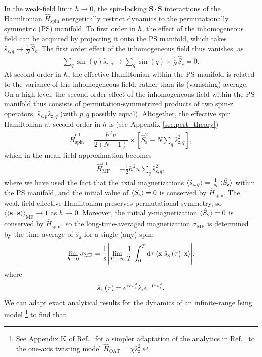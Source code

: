 \documentclass[aps,pra,nofootinbib,twocolumn,superscriptaddress]{revtex4-2}
\renewcommand{\t}{\text} %
\newcommand{\f}[2]{\dfrac{#1}{#2}} %
\newcommand{\p}[1]{\left(#1\right)} %
\renewcommand{\sp}[1]{\left[#1\right]} %
\newcommand{\bk}{\braket} %
\renewcommand{\dd}{\text{d}} %
\renewcommand{\i}{\mathrm{i}\mkern1mu} %
\newcommand{\bbk}[1]{\langle\!\langle #1 \rangle\!\rangle}
\newcommand{\1}{\mathds{1}}
\newcommand{\s}{\hat{s}}
\renewcommand{\H}{\hat{H}}
\renewcommand{\S}{\hat{S}}
\newcommand{\x}{\text{x}}
\newcommand{\y}{\text{y}}
\newcommand{\z}{\text{z}}
\newcommand{\spin}{\text{spin}}
\newcommand{\eff}{\text{eff}}
\newcommand{\MF}{\text{MF}}
\newcommand{\sds}{\bar{\bm{s}}\cdot\bar{\bm{s}}}
\begin{document}
In the weak-field limit $h\to0$, the spin-locking $\bm\S\cdot\bm\S$ interactions of the Hamiltonian $\H_\spin$ energetically restrict dynamics to the permutationally symmetric (PS) manifold.
To first order in $h$, the effect of the inhomogeneous field can be acquired by projecting it onto the PS manifold, which takes $\s_{\z,q}\to\frac1N\S_\z$.
The first order effect of the inhomogeneous field thus vanishes, as
\begin{align}
  \sum_q \sin\p{q} \s_{\z,q}
  \to \sum_q \sin\p{q} \times \frac1N \S_\z
  = 0.
\end{align}
At second order in $h$, the effective Hamiltonian within the PS manifold is related to the variance of the inhomogeneous field, rather than its (vanishing) average.
On a high level, the second-order effect of the inhomogeneous field within the PS manifold thus consists of permutation-symmetrized products of two spin-z operators, $\s_{\z,p}\s_{\z,q}$ (with $p,q$ possibly equal).
Altogether, the effective spin Hamiltonian at second order in $h$ is (see Appendix \ref{sec:pert_theory})
\begin{align}
  \H_\spin^\eff
  = \f{h^2 u}{2(N-1)} \times \sp{\S_\z^2 - N\sum_q \s_{\z,q}^2},
  \label{eq:H_spin_eff}
\end{align}
which in the mean-field approximation becomes
\begin{align}
  \H_\MF^\eff = -\frac12 h^2 u \sum_q \s_{\z,q}^2,
\end{align}
where we have used the fact that the axial magnetizations $\bk{\s_{\z,q}}=\frac1N\bk{\S_\z}$ within the PS manifold, and the initial value of $\bk{\S_\z}=0$ is conserved by $\H_\spin$.
The weak-field effective Hamiltonian preserves permutational symmetry, so $\bbk{\sds}_\MF\to1$ as $h\to0$.
Moreover, the initial y-magnetization $\bk{\S_\y}=0$ is conserved by $\H_\spin$, so the long-time-averaged magnetization $\sigma_\MF$ is determined by the time-average of $\s_\x$ for a single (any) spin:
\begin{align}
  \lim_{h\to0} \sigma_\MF
  = \f1s \abs{\lim_{T\to\infty} \f1T \int_0^T \dd\tau
  \bk{\x|\s_\x\p{\tau}|\x}},
\end{align}
where
\begin{align}
  \s_\x\p{\tau} = e^{\i\tau \s_\z^2} \s_\x e^{-\i\tau \s_\z^2}.
\end{align}
We can adapt exact analytical results for the dynamics of an infinite-range Ising model \cite{foss-feig2013nonequilibrium}\footnote{
See Appendix K of Ref.~\cite{perlin2020shorttime} for a simpler adaptation of the analytics in Ref.~\cite{foss-feig2013nonequilibrium} to the one-axis twisting model $\H_{\t{OAT}}=\chi \s_\z^2$.
} to find that
\end{document}
